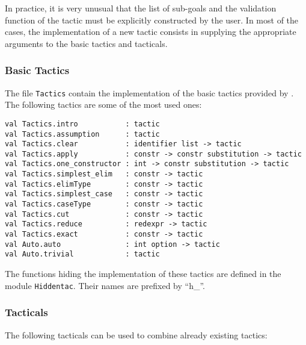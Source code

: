 In practice, it is very unusual that the list of sub-goals and the
validation function of the tactic must be explicitly constructed by
the user. In most of the cases, the implementation of a new tactic
consists in supplying the appropriate arguments to the basic tactics
and tacticals.

\subsubsection{Basic Tactics}

The file \texttt{Tactics} contain the implementation of the basic
tactics provided by \Coq. The following tactics are some of the most
used ones:

\begin{verbatim}
val Tactics.intro           : tactic
val Tactics.assumption      : tactic
val Tactics.clear           : identifier list -> tactic
val Tactics.apply           : constr -> constr substitution -> tactic
val Tactics.one_constructor : int -> constr substitution -> tactic
val Tactics.simplest_elim   : constr -> tactic
val Tactics.elimType        : constr -> tactic
val Tactics.simplest_case   : constr -> tactic
val Tactics.caseType        : constr -> tactic
val Tactics.cut             : constr -> tactic
val Tactics.reduce          : redexpr -> tactic
val Tactics.exact           : constr -> tactic
val Auto.auto               : int option -> tactic
val Auto.trivial            : tactic
\end{verbatim}

The functions hiding the implementation of these tactics are defined
in the module \texttt{Hiddentac}. Their names are prefixed by ``h\_''.

\subsubsection[Tacticals]{Tacticals\label{OcamlTacticals}}

The following tacticals can be used to combine already existing
tactics:

